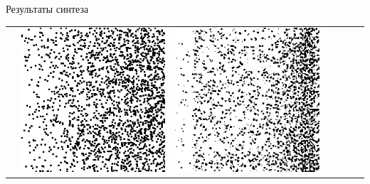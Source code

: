 \documentclass[12pt]{beamer}
\begin{document}
\begin{frame}{Результаты синтеза}
\begin{table}
\begin{center}
\begin{tabular}{p{1.2cm} p{1.2cm} p{1.2cm} p{1.2cm} p{1.2cm} p{1.2cm} p{1.2cm}}
					&
					\includegraphics[width=1\linewidth]{8-results/sand-trend8/pan1}
					&
					\includegraphics[width=1\linewidth]{8-results/sand-trend8/nf32e5/gen1}
					&

\end{tabular}
\end{center}
\end{table}
\end{frame}
\end{document}
